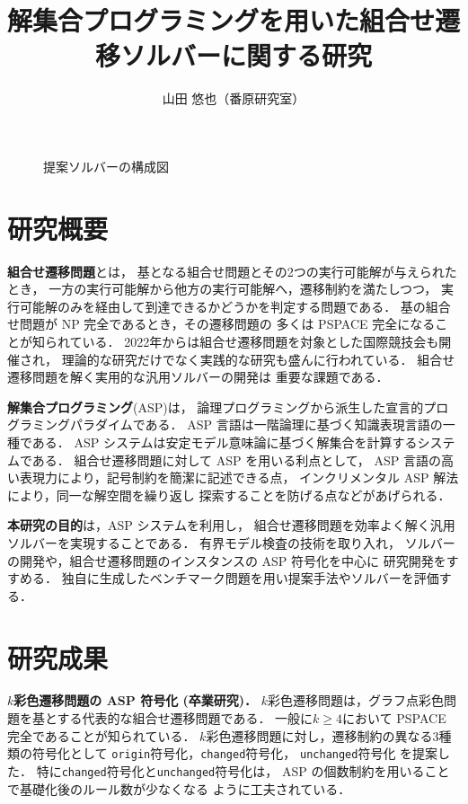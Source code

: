 \documentclass[a4j,10pt,dvipdfmx]{jarticle}
\title{解集合プログラミングを用いた組合せ遷移ソルバーに関する研究}
\author{山田 悠也（番原研究室）}
\date{}
\newcommand{\code}[1]{\lstinline[basicstyle=\ttfamily]{#1}}
\begin{document}
\maketitle
\thispagestyle{empty}

\begin{figure}[H]
  \centering
  
  \caption{提案ソルバーの構成図}
  \label{fig:bcr}
\end{figure}

\begin{multicols}{1}

\section{研究概要}
\textbf{組合せ遷移問題}とは，
基となる組合せ問題とその2つの実行可能解が与えられたとき，
一方の実行可能解から他方の実行可能解へ，遷移制約を満たしつつ，
実行可能解のみを経由して到達できるかどうかを判定する問題である．
基の組合せ問題が NP 完全であるとき，その遷移問題の
多くは PSPACE 完全になることが知られている．
2022年からは組合せ遷移問題を対象とした国際競技会も開催され，
理論的な研究だけでなく実践的な研究も盛んに行われている．
組合せ遷移問題を解く実用的な汎用ソルバーの開発は
重要な課題である．

\textbf{解集合プログラミング}(ASP)は，
論理プログラミングから派生した宣言的プログラミングパラダイムである．
ASP 言語は一階論理に基づく知識表現言語の一種である．
ASP システムは安定モデル意味論に基づく解集合を計算するシステムである．
組合せ遷移問題に対して ASP を用いる利点として，
ASP 言語の高い表現力により，記号制約を簡潔に記述できる点，
インクリメンタル ASP 解法により，同一な解空間を繰り返し
探索することを防げる点などがあげられる．

\textbf{本研究の目的}は，ASP システムを利用し，
組合せ遷移問題を効率よく解く汎用ソルバーを実現することである．
有界モデル検査の技術を取り入れ，
ソルバーの開発や，組合せ遷移問題のインスタンスの ASP 符号化を中心に
研究開発をすすめる．
独自に生成したベンチマーク問題を用い提案手法やソルバーを評価する．

\section{研究成果}
\textbf{$k$彩色遷移問題の ASP 符号化 (卒業研究)．}
$k$彩色遷移問題は，グラフ点彩色問題を基とする代表的な組合せ遷移問題である．
一般に$k \ge 4$において PSPACE 完全であることが知られている．
$k$彩色遷移問題に対し，遷移制約の異なる3種類の符号化として
\code{origin}符号化，\code{changed}符号化，
\code{unchanged}符号化
を提案した．
特に\code{changed}符号化と\code{unchanged}符号化は，
ASP の個数制約を用いることで基礎化後のルール数が少なくなる
ように工夫されている．


\end{multicols}
\end{document}
